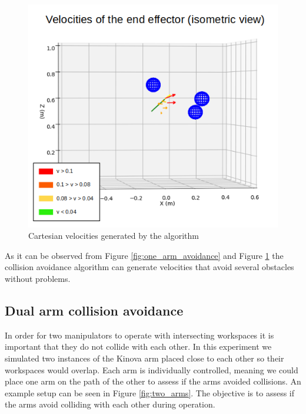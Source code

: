 \documentclass[a4paper, 10pt, conference]{ieeeconf}      %
\begin{document}
\begin{figure}[H]
	\includegraphics[scale=0.30]{images/one_arm_three_obstacles_side_vector.png}
	\caption{Cartesian velocities generated by the algorithm}
	\label{fig:one_arm_avoidance_vector}
\end{figure}

As it can be observed from Figure \ref{fig:one_arm_avoidance} and Figure \ref{fig:one_arm_avoidance_vector} the collision avoidance algorithm can generate velocities that avoid several obstacles without problems. 

\subsection{Dual arm collision avoidance} %

In order for two manipulators to operate with intersecting workspaces it is important that they do not collide with each other. In this experiment we simulated two instances of the Kinova arm placed close to each other so their workspaces would overlap. Each arm is individually controlled, meaning we could place one arm on the path of the other to assess if the arms avoided collisions. An example setup can be seen in Figure \ref{fig:two_arms}. The objective is to assess if the arms avoid colliding with each other during operation.
\end{document}

